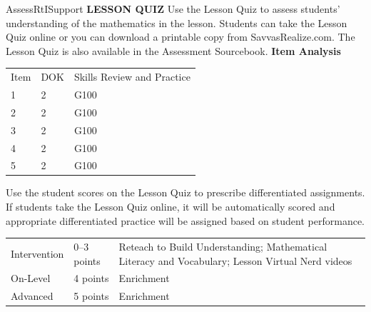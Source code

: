 \documentclass{article}
\newenvironment{te-addendum}[2]{}{}     %
\begin{document}
\begin{te-addendum}{Assess}{RtISupport}
\textbf{LESSON QUIZ}
Use the Lesson Quiz to assess students' understanding of the mathematics in the lesson.
Students can take the Lesson Quiz online or you can download a printable copy from SavvasRealize.com. The Lesson Quiz is also available in the Assessment Sourcebook.
\textbf{Item Analysis}
\begin{tabular}{lll}
Item & DOK & Skills Review and Practice \\
1 & 2 & G100 \\
2 & 2 & G100 \\
3 & 2 & G100 \\
4 & 2 & G100 \\
5 & 2 & G100 \\
\end{tabular}
Use the student scores on the Lesson Quiz to prescribe differentiated assignments.
If students take the Lesson Quiz online, it will be automatically scored and appropriate differentiated practice will be assigned based on student performance.
\begin{tabular}{lll}
Intervention & 0--3 points & Reteach to Build Understanding; Mathematical Literacy and Vocabulary; Lesson Virtual Nerd videos \\
On-Level & 4 points & Enrichment \\
Advanced & 5 points & Enrichment \\
\end{tabular}
\end{te-addendum}
\end{document}
